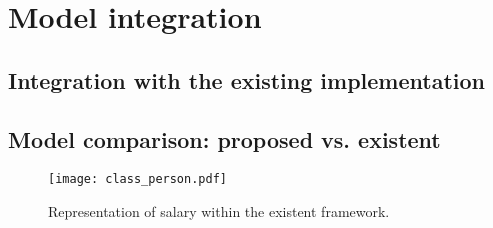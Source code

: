 \graphicspath{{images/ch6_class_person/}}
\chapter{Model integration}

\section{Integration with the existing implementation}

\section{Model comparison: proposed vs. existent}
% 

\begin{figure}[h]
    \centering
    \texttt{[image: class\_person.pdf]}
    \caption{Representation of salary within the existent framework.}
    \label{fig:class_person}
\end{figure}


